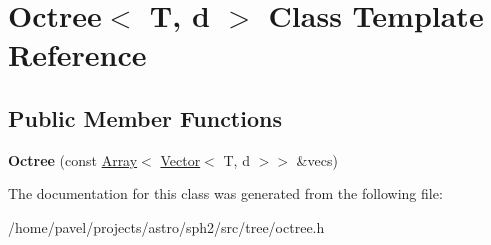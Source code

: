 \hypertarget{classOctree}{}\section{Octree$<$ T, d $>$ Class Template Reference}
\label{classOctree}
\subsection*{Public Member Functions}
\begin{DoxyCompactItemize}
\item 
\hypertarget{classOctree_a1222d95695ff4a23997b1898849f156b}{}\label{classOctree_a1222d95695ff4a23997b1898849f156b} 
{\bfseries Octree} (const \hyperlink{classArray}{Array}$<$ \hyperlink{classBasicVector}{Vector}$<$ T, d $>$$>$ \&vecs)
\end{DoxyCompactItemize}


The documentation for this class was generated from the following file\+:\begin{DoxyCompactItemize}
\item 
/home/pavel/projects/astro/sph2/src/tree/octree.\+h\end{DoxyCompactItemize}

